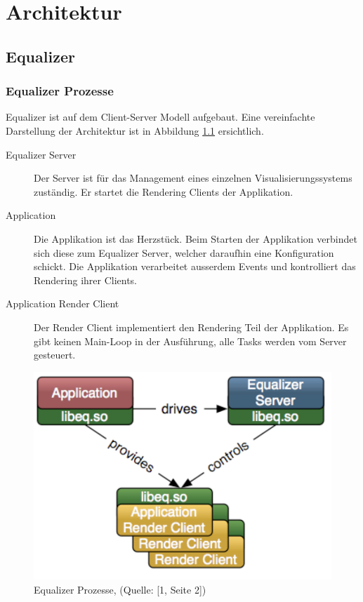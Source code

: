 \chapter{Architektur}


\section{Equalizer}

\subsection{Equalizer Prozesse}

Equalizer ist auf dem Client-Server Modell aufgebaut. Eine vereinfachte Darstellung der Architektur ist in Abbildung \ref{eq_proc} ersichtlich.

\begin{description}
\item[Equalizer Server] Der Server ist f\"ur das Management eines einzelnen Visualisierungssystems zust\"andig. Er startet die Rendering Clients der Applikation.
\item[Application] Die Applikation ist das Herzst\"uck. Beim Starten der Applikation verbindet sich diese zum Equalizer Server, welcher daraufhin eine Konfiguration schickt. Die Applikation verarbeitet ausserdem Events und kontrolliert das Rendering ihrer Clients.
\item[Application Render Client] Der Render Client implementiert den Rendering Teil der Applikation. Es gibt keinen Main-Loop in der Ausf\"uhrung, alle Tasks werden vom Server gesteuert.
\end{description}

\begin{figure}[ht]
\centering
\includegraphics[scale=0.5]{../figures/equalizer_model}
\caption{Equalizer Prozesse, (Quelle: [1, Seite 2])}
\label{eq_proc}
\end{figure}

